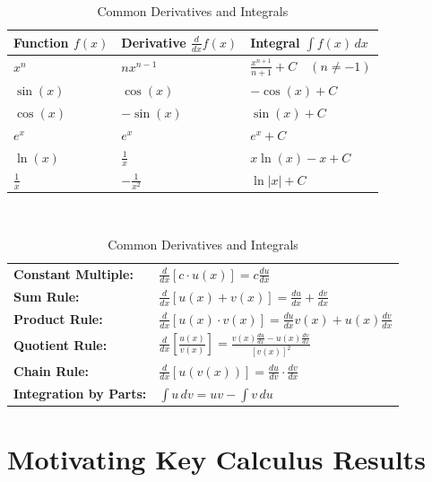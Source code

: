 \documentclass[12pt]{article}
\begin{document}
\begin{table}
\centering
\caption{Common Derivatives and Integrals}
\label{tab:common_rules}
\begin{tabular}{lll}
\toprule
\textbf{Function $f(x)$} & \textbf{Derivative $\frac{d}{dx}f(x)$} & \textbf{Integral $\int f(x) \, dx$} \\
\midrule
$x^n$ & $n x^{n-1}$ & $\frac{x^{n+1}}{n+1} + C \quad (n \neq -1)$ \\
$\sin(x)$ & $\cos(x)$ & $-\cos(x) + C$ \\
$\cos(x)$ & $-\sin(x)$ & $\sin(x) + C$ \\
$e^x$ & $e^x$ & $e^x + C$ \\
$\ln(x)$ & $\frac{1}{x}$ & $x\ln(x) - x + C$ \\
$\frac{1}{x}$ & $-\frac{1}{x^2}$ & $\ln|x| + C$ \\
\bottomrule
\end{tabular}
\\


\medskip
\medskip
\medskip

\begin{tabular}{@{}l@{\qquad}l@{}}

\textbf{Constant Multiple:}&
\(\displaystyle \frac{d}{dx}[c \cdot u(x)] = c\frac{du}{dx}\) \\[8ex]

\textbf{Sum Rule:}&
\(\displaystyle \frac{d}{dx}[u(x)+v(x)]
= \frac{du}{dx}+\frac{dv}{dx}\) \\[8ex]

\textbf{Product Rule:}&
\(\displaystyle \frac{d}{dx}[u(x)\cdot v(x)]
= \frac{du}{dx}v(x)+u(x)\frac{dv}{dx}\) \\[8ex]

\textbf{Quotient Rule:}&
\(\displaystyle \frac{d}{dx}\left[\frac{u(x)}{v(x)}\right]
= \frac{v(x)\frac{du}{dx}-u(x)\frac{dv}{dx}}{[v(x)]^2}\) \\[8ex]

\textbf{Chain Rule:}&
\(\displaystyle \frac{d}{dx}[u(v(x))]
= \frac{du}{dv}\cdot\frac{dv}{dx}\) \\[8ex]

\textbf{Integration by Parts:}&
\(\displaystyle \int u\,dv = uv-\int v\,du\) \\
\end{tabular}

\end{table}

\section{Motivating Key Calculus Results}
\end{document}
